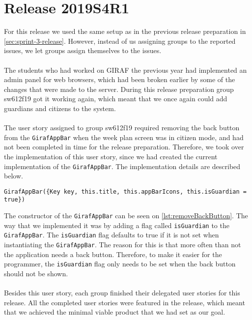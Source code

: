 \section{Release 2019S4R1}
For this release we used the same setup as in the previous release preparation in \autoref{sec:sprint-3-release}. 
However, instead of us assigning groups to the reported issues, we let groups assign themselves to the issues.
\\\\
The students who had worked on GIRAF the previous year had implemented an admin panel for web browsers, which had been broken earlier by some of the changes that were made to the server.
During this release preparation group sw612f19 got it working again, which meant that we once again could add guardians and citizens to the system.
\\\\
The user story assigned to group sw612f19 required removing the back button from the \texttt{GirafAppBar} when the week plan screen was in citizen mode, and had not been completed in time for the release preparation.
Therefore, we took over the implementation of this user story, since we had created the current implementation of the \texttt{GirafAppBar}.
The implementation details are described below.
\begin{lstlisting}[caption={Removing back button from the citizens screen},label={lst:removeBackButton},language={[Sharp]C}]
    GirafAppBar({Key key, this.title, this.appBarIcons, this.isGuardian = true})
\end{lstlisting}
The constructor of the \texttt{GirafAppBar} can be seen on \autoref{lst:removeBackButton}. 
The way that we implemented it was by adding a flag called \texttt{isGuardian} to the \texttt{GirafAppBar}. 
The \texttt{isGuardian} flag defaults to true if it is not set when instantiating the \texttt{GirafAppBar}.
The reason for this is that more often than not the application needs a back button.
Therefore, to make it easier for the programmer, the \texttt{isGuardian} flag only needs to be set when the back button should not be shown.
\\\\
Besides this user story, each group finished their delegated user stories for this release.
All the completed user stories were featured in the release, which meant that we achieved the minimal viable product that we had set as our goal. 
